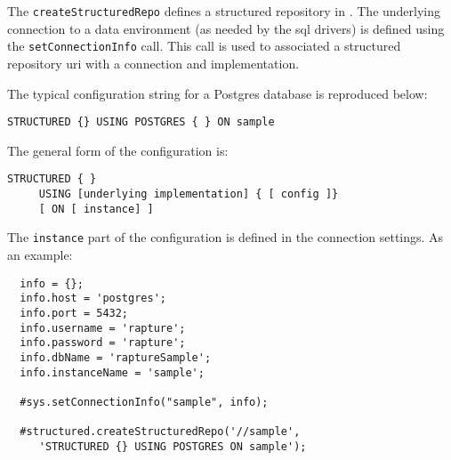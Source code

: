 The \verb+createStructuredRepo+ defines a structured repository in \Rapture. The underlying connection
to a data environment (as needed by the sql drivers) is defined using the \verb+setConnectionInfo+ call. This call is used
to associated a structured repository uri with a connection and implementation.

The typical configuration string for a Postgres database is reproduced below:

\begin{Verbatim}
STRUCTURED {} USING POSTGRES { } ON sample
\end{Verbatim}

The general form of the configuration is:

\begin{Verbatim}
STRUCTURED { }
     USING [underlying implementation] { [ config ]}
     [ ON [ instance] ]
\end{Verbatim}

The \verb+instance+ part of the configuration is defined in the connection settings. As an example:

\begin{Verbatim}
  info = {};
  info.host = 'postgres';
  info.port = 5432;
  info.username = 'rapture';
  info.password = 'rapture';
  info.dbName = 'raptureSample';
  info.instanceName = 'sample';

  #sys.setConnectionInfo("sample", info);

  #structured.createStructuredRepo('//sample',
     'STRUCTURED {} USING POSTGRES ON sample');
\end{Verbatim}
